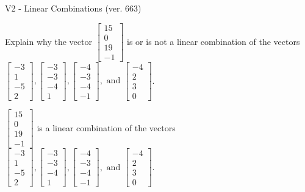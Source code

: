 \begin{exercise}
  \begin{exerciseTitle}V2 - Linear Combinations (ver. 663)\end{exerciseTitle}
  \begin{exerciseStatement}
    Explain why the vector \(\left[\begin{array}{c}
15 \\
0 \\
19 \\
-1
\end{array}\right]\)  is or is not a linear 
	combination of the vectors \(\left[\begin{array}{c}
-3 \\
1 \\
-5 \\
2
\end{array}\right] , \left[\begin{array}{c}
-3 \\
-3 \\
-4 \\
1
\end{array}\right] , \left[\begin{array}{c}
-4 \\
-3 \\
-4 \\
-1
\end{array}\right] , \text{ and } \left[\begin{array}{c}
-4 \\
2 \\
3 \\
0
\end{array}\right]\).
	


  \end{exerciseStatement}
  \begin{exerciseAnswer}
   \(\left[\begin{array}{c}
15 \\
0 \\
19 \\
-1
\end{array}\right]\) 
  	 is  
	a linear combination of the vectors \(\left[\begin{array}{c}
-3 \\
1 \\
-5 \\
2
\end{array}\right] , \left[\begin{array}{c}
-3 \\
-3 \\
-4 \\
1
\end{array}\right] , \left[\begin{array}{c}
-4 \\
-3 \\
-4 \\
-1
\end{array}\right] , \text{ and } \left[\begin{array}{c}
-4 \\
2 \\
3 \\
0
\end{array}\right]\).


\end{exerciseAnswer}
\end{exercise}
